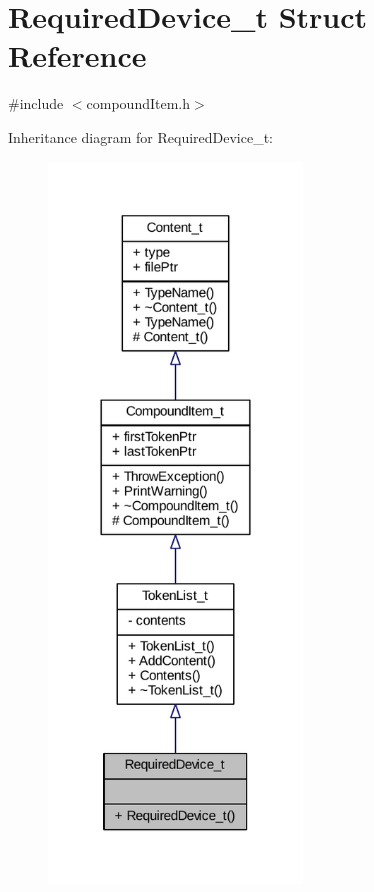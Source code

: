 \hypertarget{struct_required_device__t}{}\section{Required\+Device\+\_\+t Struct Reference}
\label{struct_required_device__t}


{\ttfamily \#include $<$compound\+Item.\+h$>$}



Inheritance diagram for Required\+Device\+\_\+t\+:
\nopagebreak
\begin{figure}[H]
\begin{center}
\leavevmode
\includegraphics[width=191pt]{struct_required_device__t__inherit__graph}
\end{center}
\end{figure}


